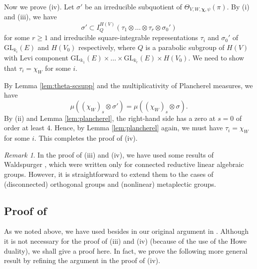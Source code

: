 \documentclass[11pt]{amsart}
\numberwithin{equation}{section}
\theoremstyle{plain}
\theoremstyle{definition}
\theoremstyle{remark}
\newtheorem{rem}[thm]{Remark}
\def\GL{\mathrm{GL}}
\def\Chi{\boldsymbol{\chi}}
\begin{document}
Now we prove (iv).
Let $\sigma'$ be an irreducible subquotient of $\Theta_{V,W,\Chi,\psi}(\pi)$.
By (i) and (iii), we have
\[
 \sigma' \subset I^{H(V)}_Q(\tau_1 \otimes \dots \otimes \tau_r \otimes \sigma_0')
\]
for some $r \ge 1$ and irreducible square-integrable representations $\tau_i$ and $\sigma_0'$ of $\GL_{k_i}(E)$ and $H(V_0)$ respectively, where $Q$ is a parabolic subgroup of $H(V)$ with Levi component $\GL_{k_1}(E) \times \dots \times \GL_{k_r}(E) \times H(V_0)$.
We need to show that $\tau_i = \chi_W$ for some $i$.

By Lemma \ref{lem:theta-scsupp} and the multiplicativity of Plancherel measures, we have
\[
 \mu((\chi_W)_s \otimes \sigma') = \mu((\chi_W)_s \otimes \sigma).
\]
By (ii) and Lemma \ref{lem:plancherel}, the right-hand side has a zero at $s=0$ of order at least $4$.
Hence, by Lemma \ref{lem:plancherel} again, we must have $\tau_i = \chi_W$ for some $i$.
This completes the proof of (iv).

\begin{rem}
In the proof of (iii) and (iv), we have used some results of Waldspurger \cite{w0}, which were written only for connected reductive linear algebraic groups.
However, it is straightforward to extend them to the cases of (disconnected) orthogonal groups and (nonlinear) metaplectic groups.
\end{rem}

\subsection{Proof of \cite[Theorem 5.1(i)]{muic}}

As we noted above, we have used \cite[Theorem 5.1(i)]{muic} besides \cite[Lemma 4.2]{muic} in our original argument in \cite{gi}.
Although it is not necessary for the proof of (iii) and (iv) (because of the use of the Howe duality), we shall give a proof here.
In fact, we prove the following more general result by refining the argument in the proof of (iv).
\end{document}
